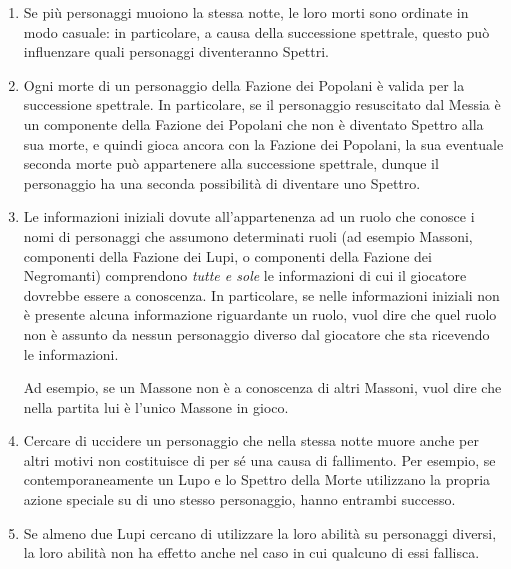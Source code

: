 \documentclass[a4paper,10pt]{article}
\begin{document}
\begin{enumerate}
	\item Se più personaggi muoiono la stessa notte, le loro morti sono ordinate in modo casuale: in particolare, a causa della successione spettrale, questo può influenzare quali personaggi diventeranno Spettri.
	
	\item Ogni morte di un personaggio della Fazione dei Popolani è valida per la successione spettrale. In particolare, se il personaggio resuscitato dal Messia è un componente della Fazione dei Popolani che non è diventato Spettro alla sua morte, e quindi gioca ancora con la Fazione dei Popolani, la sua eventuale seconda morte può appartenere alla successione spettrale, dunque il personaggio ha una seconda possibilità di diventare uno Spettro.
	
	\item Le informazioni iniziali dovute all'appartenenza ad un ruolo che conosce i nomi di personaggi che assumono determinati ruoli (ad esempio Massoni, componenti della Fazione dei Lupi, o componenti della Fazione dei Negromanti) comprendono \emph{tutte e sole} le informazioni di cui il giocatore dovrebbe essere a conoscenza. In particolare, se nelle informazioni iniziali non è presente alcuna informazione riguardante un ruolo, vuol dire che quel ruolo non è assunto da nessun personaggio diverso dal giocatore che sta ricevendo le informazioni.
	
	Ad esempio, se un Massone non è a conoscenza di altri Massoni, vuol dire che nella partita lui è l'unico Massone in gioco.
	
	\item Cercare di uccidere un personaggio che nella stessa notte muore anche per altri motivi non costituisce di per sé una causa di fallimento.
	Per esempio, se contemporaneamente un Lupo e lo Spettro della Morte utilizzano la propria azione speciale su di uno stesso personaggio, hanno entrambi successo.
	
	\item Se almeno due Lupi cercano di utilizzare la loro abilità su personaggi diversi, la loro abilità non ha effetto anche nel caso in cui qualcuno di essi fallisca.
	

\end{enumerate}
\end{document}
